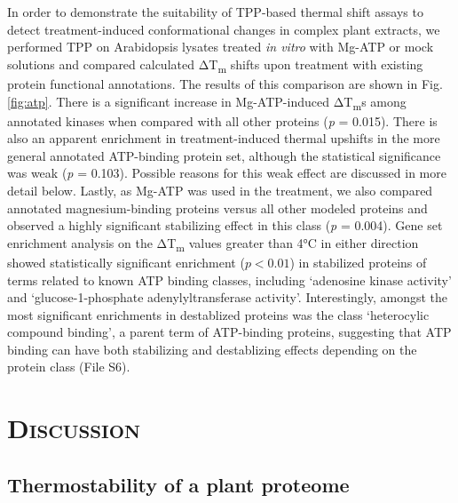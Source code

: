 \documentclass[11pt,letter]{article}\usepackage[]{graphicx}\usepackage[]{color}
\newcommand{\Tm}{T\textsubscript{m}}
\newcommand{\DeltaTm}{Δ\Tm}
\newcommand{\celsius}[1]{#1°C}
\begin{document}
In order to demonstrate the suitability of TPP-based thermal shift assays to
detect treatment-induced conformational changes in complex plant extracts, we
performed TPP on Arabidopsis lysates treated \textit{in vitro} with Mg-ATP or
mock solutions and compared calculated \DeltaTm{} shifts upon treatment with
existing protein functional annotations. The results of this comparison are
shown in Fig. \ref{fig:atp}. There is a significant increase in
Mg-ATP-induced \DeltaTm{}s among annotated kinases when compared with all
other proteins (\textit{p} = 0.015). There is also an apparent
enrichment in treatment-induced thermal upshifts in the more general annotated
ATP-binding protein set, although the statistical significance was weak
(\textit{p} = 0.103). Possible reasons for this weak effect
are discussed in more detail below. Lastly, as Mg-ATP was used in the
treatment, we also compared annotated magnesium-binding proteins versus all
other modeled proteins and observed a highly significant stabilizing effect in
this class (\textit{p} = 0.004). Gene set enrichment analysis
on the \DeltaTm{} values greater than \celsius{4} in either
direction showed statistically significant enrichment ($p<0.01$) in stabilized
proteins of terms related to known ATP binding classes, including `adenosine
kinase activity' and `glucose-1-phosphate adenylyltransferase activity'.
Interestingly, amongst the most significant enrichments in destablized
proteins was the class `heterocylic compound binding', a parent term of
ATP-binding proteins, suggesting that ATP binding can have both stabilizing
and destablizing effects depending on the protein class (File
S6).


\section*{\textsc{Discussion}}

\subsection*{Thermostability of a plant proteome}
\end{document}

